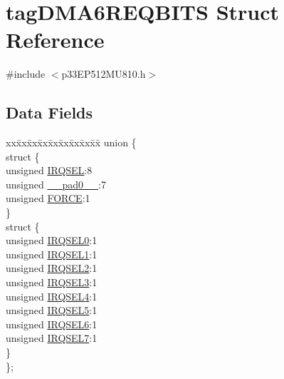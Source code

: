 \hypertarget{structtag_d_m_a6_r_e_q_b_i_t_s}{}\section{tag\+D\+M\+A6\+R\+E\+Q\+B\+I\+TS Struct Reference}
\label{structtag_d_m_a6_r_e_q_b_i_t_s}


{\ttfamily \#include $<$p33\+E\+P512\+M\+U810.\+h$>$}

\subsection*{Data Fields}
\begin{DoxyCompactItemize}
\item 
\begin{tabbing}
xx\=xx\=xx\=xx\=xx\=xx\=xx\=xx\=xx\=\kill
union \{\\
\>struct \{\\
\>\>unsigned \hyperlink{structtag_d_m_a6_r_e_q_b_i_t_s_a5e70ba01366ab2f37371d52661dd93b2}{IRQSEL}:8\\
\>\>unsigned \hyperlink{structtag_d_m_a6_r_e_q_b_i_t_s_adf71f3d8410c1f1dbbc96680a92c49af}{\_\_pad0\_\_}:7\\
\>\>unsigned \hyperlink{structtag_d_m_a6_r_e_q_b_i_t_s_a9b378a7ffc1ab4bc4a3710fb36389180}{FORCE}:1\\
\>\} \\
\>struct \{\\
\>\>unsigned \hyperlink{structtag_d_m_a6_r_e_q_b_i_t_s_ac73241b8f783760c9192dfd8a0773cad}{IRQSEL0}:1\\
\>\>unsigned \hyperlink{structtag_d_m_a6_r_e_q_b_i_t_s_a45e1f083e5a8a59f25acc35910732426}{IRQSEL1}:1\\
\>\>unsigned \hyperlink{structtag_d_m_a6_r_e_q_b_i_t_s_a60dda7474727b3624ca25fa0067a8924}{IRQSEL2}:1\\
\>\>unsigned \hyperlink{structtag_d_m_a6_r_e_q_b_i_t_s_aeaafe1b8c89398ed382054ab628aed78}{IRQSEL3}:1\\
\>\>unsigned \hyperlink{structtag_d_m_a6_r_e_q_b_i_t_s_a91c4162e0f3d4ac7adcdb49302f19840}{IRQSEL4}:1\\
\>\>unsigned \hyperlink{structtag_d_m_a6_r_e_q_b_i_t_s_a6382d50430464cf20b3dee3dbf2e8c01}{IRQSEL5}:1\\
\>\>unsigned \hyperlink{structtag_d_m_a6_r_e_q_b_i_t_s_ace52408ef8c29561f3c56a3fbcbc8217}{IRQSEL6}:1\\
\>\>unsigned \hyperlink{structtag_d_m_a6_r_e_q_b_i_t_s_acce7dedecdf1f53cdbead3edf7c5d53a}{IRQSEL7}:1\\
\>\} \\
\}; \\

\end{tabbing}\end{DoxyCompactItemize}


